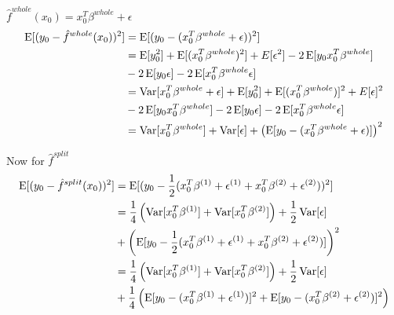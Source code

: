 
\newcommand{\fh}[1]{\hat{f}^{#1}}





$\hat{f}^{whole}(x_0) = x_0^T\beta^{whole} + \epsilon$
\begin{align*}
    \E[(y_0 - \fh{whole}(x_0))^2] &= \E[(y_0-(x_0^T\beta^{whole} + \epsilon))^2]\\
        &= \E[y_0^2] + \E[(x_0^T\beta^{whole})^2] + E[\epsilon^2] - 2\E[y_0x_0^T\beta^{whole}] \\&- 2\E[y_0\epsilon] - 2\E[x_0^T\beta^{whole}\epsilon]\\
        &= \Var[x_0^T\beta^{whole} + \epsilon] + \E[y_0^2] + \E[(x_0^T\beta^{whole})]^2 + E[\epsilon]^2 \\&- 2\E[y_0x_0^T\beta^{whole}] - 2\E[y_0\epsilon] - 2\E[x_0^T\beta^{whole}\epsilon]\\
        &= \Var[x_0^T\beta^{whole}] + \Var[\epsilon] +  \left(\E[y_0-(x_0^T\beta^{whole} + \epsilon)]\right)^2
\end{align*}

Now for $\fh{split}$
\begin{align*}
    \E[(y_0 - \fh{split}(x_0))^2] &= \E[(y_0 - \frac{1}{2}(x_0^T\beta^{(1)} + \epsilon^{(1)}+ x_0^T\beta^{(2)}+ \epsilon^{(2)}))^2] \\
    &= \frac{1}{4}\left(\Var[x_0^T\beta^{(1)}] + \Var[x_0^T\beta^{(2)}]\right) + \frac{1}{2}\Var[\epsilon] \\&+ \left(\E[y_0 - \frac{1}{2}(x_0^T\beta^{(1)} + \epsilon^{(1)}+ x_0^T\beta^{(2)}+ \epsilon^{(2)})]\right)^2 \\
    &= \frac{1}{4}\left(\Var[x_0^T\beta^{(1)}] + \Var[x_0^T\beta^{(2)}]\right) + \frac{1}{2}\Var[\epsilon] \\&+ \frac{1}{4}\left(\E[y_0 - (x_0^T\beta^{(1)} + \epsilon^{(1)})]^2 + \E[y_0 - (x_0^T\beta^{(2)} + \epsilon^{(2)})]^2\right) \\
\end{align*}